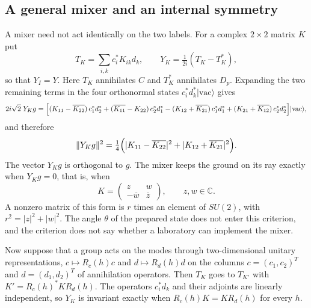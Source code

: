\documentclass[11pt]{article}
\theoremstyle{definition}
\newcommand{\C}{\mathbb C}
\newcommand{\ket}[1]{\lvert #1\rangle}
\begin{document}
\subsection{A general mixer and an internal symmetry}
\label{subsec:pair-currents-mixers}

A mixer need not act identically on the two labels. For a complex $2\times2$ matrix $K$ put
\begin{equation}
 T_K=\sum_{i,k}c_i^*K_{ik}d_k,\qquad Y_K=\tfrac1{2i}(T_K-T_K^*),
 \label{eq:pair-currents-mixer}
\end{equation}
so that $Y_I=Y$. Here $T_K$ annihilates $C$ and $T_K^*$ annihilates $D_p$. Expanding the two remaining terms in the four orthonormal states $c_i^*d_k^*\ket{\mathrm{vac}}$ gives
\begin{equation}
 2i\sqrt2\;Y_Kg=\Bigl[(K_{11}-\overline{K_{22}})\,c_1^*d_2^*+(\overline{K_{11}}-K_{22})\,c_2^*d_1^*
 -(K_{12}+\overline{K_{21}})\,c_1^*d_1^*+(K_{21}+\overline{K_{12}})\,c_2^*d_2^*\Bigr]\ket{\mathrm{vac}},
 \label{eq:pair-currents-mixer-image}
\end{equation}
and therefore
\begin{equation}
 \|Y_Kg\|^2=\tfrac14\Bigl(|K_{11}-\overline{K_{22}}|^2+|K_{12}+\overline{K_{21}}|^2\Bigr).
 \label{eq:pair-currents-leakage}
\end{equation}
The vector $Y_Kg$ is orthogonal to $g$. The mixer keeps the ground on its ray exactly when $Y_Kg=0$, that is, when
\begin{equation}
 K=\begin{pmatrix}z&w\\-\overline w&\overline z\end{pmatrix},\qquad z,w\in\C .
 \label{eq:pair-currents-quaternion}
\end{equation}
A nonzero matrix of this form is $r$ times an element of $SU(2)$, with $r^2=|z|^2+|w|^2$. The angle $\theta$ of the prepared state does not enter this criterion, and the criterion does not say whether a laboratory can implement the mixer.

Now suppose that a group acts on the modes through two-dimensional unitary representations, $c\mapsto R_c(h)c$ and $d\mapsto R_d(h)d$ on the columns $c=(c_1,c_2)^T$ and $d=(d_1,d_2)^T$ of annihilation operators. Then $T_K$ goes to $T_{K'}$ with $K'=R_c(h)^*KR_d(h)$. The operators $c_i^*d_k$ and their adjoints are linearly independent, so $Y_K$ is invariant exactly when $R_c(h)K=KR_d(h)$ for every $h$.
\end{document}
